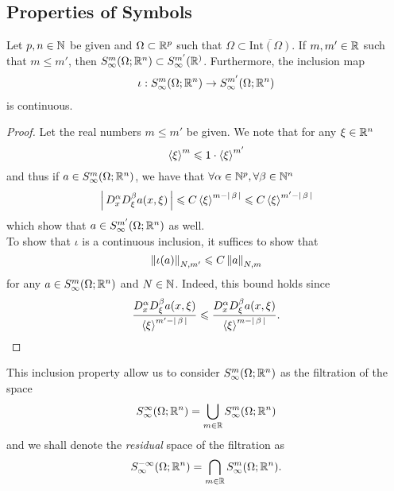 \documentclass{article}
\begin{document}
\subsection{Properties of Symbols}

\begin{fprop}
    Let $p, n \in \N$ be given and $\Omega \subset \R^p$ such that $\Omega \subset \overline{\mathrm{Int}(\Omega)}$. If $m, m' \in \R$ such that $m \leq m'$, then $S^m_\infty(\Omega; \R^n) \subset S^{m'}_\infty(\R^)$. Furthermore, the inclusion map 
    \begin{align*}
    \iota: S^m_\infty(\Omega; \R^n) \to S^{m'}_\infty(\Omega; \R^n)
    \end{align*}
    is continuous. 
\end{fprop}
\begin{proof}
    Let the real numbers $m \leq m'$ be given. We note that for any $\xi \in \R^n$
    \[
     \sym[\xi]^m \leq 1 \cdot \sym[\xi]^{m'}
     \]
    and thus if $a \in S^{m}_\infty(\Omega; \R^n)$, we have that $\forall \alpha \in \N^p, \forall \beta \in \N^n$
    \[
    \abs{D^\alpha_x D^\beta_\xi a(x, \xi)} \leq C \sym[\xi]^{m - \abs{\beta}} \leq C \sym[\xi]^{m' - \abs{\beta}} 
    \]
    which show that $a \in S^{m'}_\infty(\Omega; \R^n)$ as well. \\
    
    To show that $\iota$ is a continuous inclusion, it suffices to show that 
    \[
    \norm[\iota(a)]_{N, m'} \leq C \norm[a]_{N, m}
    \]
    for any $a \in S^{m}_\infty(\Omega; \R^n)$ and $N \in \N$. Indeed, this bound holds since 
    \[
    \frac{D^\alpha_x D^\beta_\xi a(x, \xi)}{\sym[\xi]^{m' - \abs{\beta}}}  \leq \frac{D^\alpha_x D^\beta_\xi a(x, \xi)}{\sym[\xi]^{m - \abs{\beta}}}. 
    \]
\end{proof}

This inclusion property allow us to consider $S^{m}_\infty(\Omega; \R^n)$ as the filtration of the space 
\[
S^\infty_\infty(\Omega; \R^n) = \bigcup_{m \in \R} S^{m}_\infty(\Omega; \R^n)
\]
and we shall denote the \emph{residual} space of the filtration as 
\[
S^{-\infty}_\infty(\Omega; \R^n) = \bigcap_{m \in \R} S^{m}_\infty(\Omega; \R^n). 
\]
\end{document}
